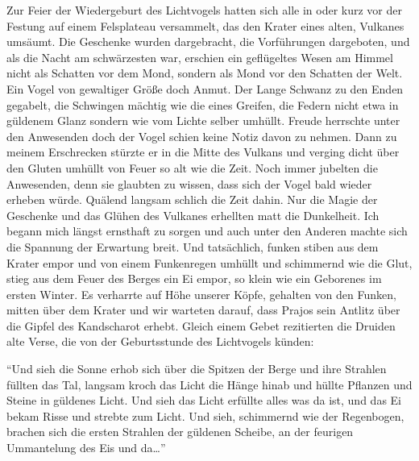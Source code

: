 Zur Feier der Wiedergeburt des Lichtvogels hatten sich alle in oder kurz vor der Festung auf einem Felsplateau versammelt, das den Krater eines alten, Vulkanes umsäumt. Die Geschenke wurden dargebracht, die Vorführungen dargeboten, und als die Nacht am schwärzesten war, erschien ein geflügeltes Wesen am Himmel nicht als Schatten vor dem Mond, sondern als Mond vor den Schatten der Welt. Ein Vogel von gewaltiger Größe doch Anmut. Der Lange Schwanz zu den Enden gegabelt, die Schwingen mächtig wie die eines Greifen, die Federn nicht etwa in güldenem Glanz sondern wie vom Lichte selber umhüllt. Freude herrschte unter den Anwesenden doch der Vogel schien keine Notiz davon zu nehmen. Dann zu meinem Erschrecken stürzte er in die Mitte des Vulkans und verging dicht über den Gluten umhüllt von Feuer so alt wie die Zeit. Noch immer jubelten die Anwesenden, denn sie glaubten zu wissen, dass sich der Vogel bald wieder erheben würde. Quälend langsam schlich die Zeit dahin. Nur die Magie der Geschenke und das Glühen des Vulkanes erhellten matt die Dunkelheit. Ich begann mich längst ernsthaft zu sorgen und auch unter den Anderen machte sich die Spannung der Erwartung breit. Und tatsächlich, funken stiben aus dem Krater empor und von einem Funkenregen umhüllt und schimmernd wie die Glut, stieg aus dem Feuer des Berges ein Ei empor, so klein wie ein Geborenes im ersten Winter. Es verharrte auf Höhe unserer Köpfe, gehalten von den Funken, mitten über dem Krater und wir warteten darauf, dass Prajos sein Antlitz über die Gipfel des Kandscharot erhebt. Gleich einem Gebet rezitierten die Druiden alte Verse, die von der Geburtsstunde des Lichtvogels künden:

``Und sieh die Sonne erhob sich über die Spitzen der Berge und ihre Strahlen füllten das Tal, langsam kroch das Licht die Hänge hinab und hüllte Pflanzen und Steine in güldenes Licht. Und sieh das Licht erfüllte alles was da ist, und das Ei bekam Risse und strebte zum Licht. Und sieh, schimmernd wie der Regenbogen, brachen sich die ersten Strahlen der güldenen Scheibe, an der feurigen Ummantelung des Eis und da\dots''

